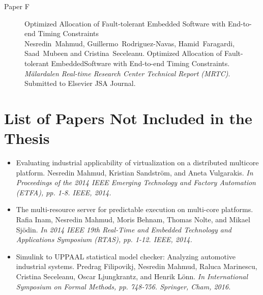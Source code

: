 {\begin{description}
	\item[Paper F] Optimized Allocation of Fault-tolerant Embedded Software with End-to-end Timing Constraints\\[6pt]
	Nesredin~Mahmud, Guillermo~Rodriguez-Navas, Hamid~Faragardi, Saad~Mubeen and Cristina~Seceleanu. Optimized Allocation of Fault-tolerant EmbeddedSoftware with End-to-end Timing Constraints. \textit{M\"{a}lardalen Real-time Research Center Technical Report (MRTC)}. Submitted to Elsevier JSA Journal. \label{lbl_softwareallocation_pso}
    \end{description}
\section*{\Large  List of Papers Not Included in the Thesis}
\vspace{1\baselineskip}
\begin{itemize}	
	\item Evaluating industrial applicability of virtualization on a distributed multicore platform. Nesredin Mahmud, Kristian Sandstr{\"o}m, and Aneta Vulgarakis.  \textit{In Proceedings of the 2014 IEEE Emerging Technology and Factory Automation (ETFA), pp. 1-8. IEEE, 2014.}
	\item The multi-resource server for predictable execution on multi-core platforms. Rafia Inam, Nesredin Mahmud, Moris Behnam, Thomas Nolte, and Mikael Sj{\"o}din. \textit{In 2014 IEEE 19th Real-Time and Embedded Technology and Applications Symposium (RTAS), pp. 1-12. IEEE, 2014.}
	\item Simulink to UPPAAL statistical model checker: Analyzing automotive industrial systems. Predrag Filipovikj, Nesredin Mahmud, Raluca Marinescu, Cristina Seceleanu, Oscar Ljungkrantz, and Henrik L{\"o}nn. \textit{In International Symposium on Formal Methods, pp. 748-756. Springer, Cham, 2016.}
\end{itemize}

\vspace{1\baselineskip} }


\newcommand{\dedication}%
{\cleardoublepage
\thispagestyle{empty}
\vspace*{\stretch{3}}
\begin{flushright}
		
{\fontfamily{pzc}\Large\selectfont\emph{To My Parents}}

\end{flushright}
\vspace*{\stretch{1}}} %

